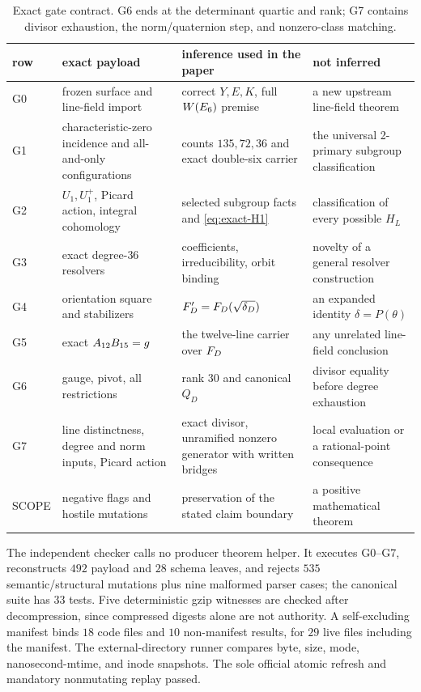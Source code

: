\begin{table}[t]
\centering
\small
\begin{tabularx}{\textwidth}{@{}>{\raggedright\arraybackslash}p{}
 >{\raggedright\arraybackslash}p{}
 >{\raggedright\arraybackslash}X
 >{\raggedright\arraybackslash}X@{}}
\toprule
row & exact payload & inference used in the paper & not inferred\\
\midrule
G0 & frozen surface and line-field import
& correct \(Y,E,K\), full \(W(E_6)\) premise
& a new upstream line-field theorem\\
G1 & characteristic-zero incidence and all-and-only configurations
& counts \(135,72,36\) and exact double-six carrier
& the universal 2-primary subgroup classification\\
G2 & \(U_1,U_1^+\), Picard action, integral cohomology
& selected subgroup facts and \cref{eq:exact-H1}
& classification of every possible \(H_L\)\\
G3 & exact degree-\(36\) resolvers
& coefficients, irreducibility, orbit binding
& novelty of a general resolver construction\\
G4 & orientation square and stabilizers
& \(F_D'=F_D(\sqrt{\delta_D})\)
& an expanded identity \(\delta=P(\theta)\)\\
G5 & exact \(A_{12}B_{15}=g\)
& the twelve-line carrier over \(F_D\)
& any unrelated line-field conclusion\\
G6 & gauge, pivot, all restrictions
& rank \(30\) and canonical \(Q_D\)
& divisor equality before degree exhaustion\\
G7 & line distinctness, degree and norm inputs, Picard action
& exact divisor, unramified nonzero generator with written bridges
& local evaluation or a rational-point consequence\\
\midrule
SCOPE & negative flags and hostile mutations
& preservation of the stated claim boundary
& a positive mathematical theorem\\
\bottomrule
\end{tabularx}
\caption{Exact gate contract.  G6 ends at the determinant quartic and rank;
G7 contains divisor exhaustion, the norm/quaternion step, and nonzero-class
matching.}
\label{tab:gates}
\end{table}

The independent checker calls no producer theorem helper.  It executes
G0--G7, reconstructs \(492\) payload and \(28\) schema leaves, and rejects
\(535\) semantic/structural mutations plus nine malformed parser cases; the
canonical suite has \(33\) tests.  Five deterministic gzip witnesses are
checked after decompression, since compressed digests alone are not
authority.  A self-excluding manifest binds \(18\) code files and \(10\)
non-manifest results, for \(29\) live files including the manifest.  The
external-directory runner compares byte, size, mode, nanosecond-mtime, and
inode snapshots.  The sole official atomic refresh and mandatory
nonmutating replay passed.

